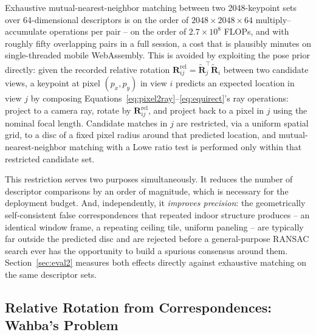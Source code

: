 \documentclass[11pt]{article}
\newcommand{\mat}[1]{\mathbf{#1}}
\begin{document}
Exhaustive mutual-nearest-neighbor matching between two 2048-keypoint sets over 64-dimensional descriptors is on the order of $2048 \times 2048 \times 64$ multiply--accumulate operations per pair -- on the order of $2.7\times 10^8$ FLOPs, and with roughly fifty overlapping pairs in a full session, a cost that is plausibly minutes on single-threaded mobile WebAssembly. This is avoided by exploiting the pose prior directly: given the recorded relative rotation $\mat{R}^{\mathrm{rel}}_{ij} = \tilde{\mat{R}}_j^{\!\top}\tilde{\mat{R}}_i$ between two candidate views, a keypoint at pixel $(p_x,p_y)$ in view $i$ predicts an expected location in view $j$ by composing Equations~\eqref{eq:pixel2ray}--\eqref{eq:equirect}'s ray operations: project to a camera ray, rotate by $\mat{R}^{\mathrm{rel}}_{ij}$, and project back to a pixel in $j$ using the nominal focal length. Candidate matches in $j$ are restricted, via a uniform spatial grid, to a disc of a fixed pixel radius around that predicted location, and mutual-nearest-neighbor matching with a Lowe ratio test is performed only within that restricted candidate set.

This restriction serves two purposes simultaneously. It reduces the number of descriptor comparisons by an order of magnitude, which is necessary for the deployment budget. And, independently, it \emph{improves precision}: the geometrically self-consistent false correspondences that repeated indoor structure produces -- an identical window frame, a repeating ceiling tile, uniform paneling -- are typically far outside the predicted disc and are rejected before a general-purpose RANSAC search ever has the opportunity to build a spurious consensus around them. Section~\ref{sec:eval2} measures both effects directly against exhaustive matching on the same descriptor sets.

\subsection{Relative Rotation from Correspondences: Wahba's Problem}
\label{sec:wahba}
\end{document}
